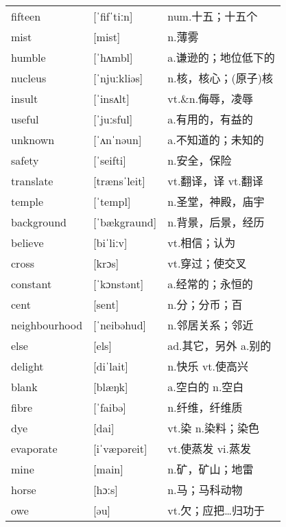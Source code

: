 \documentclass[a4paper]{article}
\begin{document}
\section{}
\begin{tabular}{l l l}

fifteen & [ˈfifˈtiːn] & num.十五；十五个 \\
mist & [mist] & n.薄雾 \\
humble & [ˈhʌmbl] & a.谦逊的；地位低下的 \\
nucleus & [ˈnjuːkliəs] & n.核，核心；(原子)核 \\
insult & [ˈinsʌlt] & vt.\&n.侮辱，凌辱 \\
useful & [ˈjuːsful] & a.有用的，有益的 \\
unknown & [ˈʌnˈnəun] & a.不知道的；未知的 \\
safety & [ˈseifti] & n.安全，保险 \\
translate & [trænsˈleit] & vt.翻译，译 vt.翻译 \\
temple & [ˈtempl] & n.圣堂，神殿，庙宇 \\
background & [ˈbækgraund] & n.背景，后景，经历 \\
believe & [biˈliːv] & vt.相信；认为 \\
cross & [krɔs] & vt.穿过；使交叉 \\
constant & [ˈkɔnstənt] & a.经常的；永恒的 \\
cent & [sent] & n.分；分币；百 \\
neighbourhood & [ˈneibəhud] & n.邻居关系；邻近 \\
else & [els] & ad.其它，另外 a.别的 \\
delight & [diˈlait] & n.快乐 vt.使高兴 \\
blank & [blæŋk] & a.空白的 n.空白 \\
fibre & [ˈfaibə] & n.纤维，纤维质 \\
dye & [dai] & vt.染 n.染料；染色 \\
evaporate & [iˈvæpəreit] & vt.使蒸发 vi.蒸发 \\
mine & [main] & n.矿，矿山；地雷 \\
horse & [hɔːs] & n.马；马科动物 \\
owe & [əu] & vt.欠；应把…归功于 \\

\end{tabular}
\end{document}

